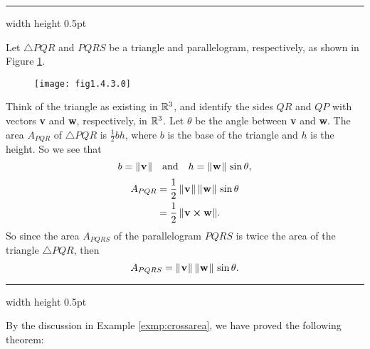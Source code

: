 \vspace{4mm}
\hrule width \textwidth height 0.5pt
\begin{exmp}\label{exmp:crossarea}
 Let $\triangle PQR$ and $PQRS$ be a triangle and parallelogram, respectively, as shown in Figure \ref{fig:crossarea}.

 \begin{figure}[h]
 \begin{center}
  \texttt{[image: fig1.4.3.0]}\vspace{-5mm}
 \end{center}
 \caption[]{}
 \label{fig:crossarea}
\end{figure}

 Think of the triangle as existing in $\mathbb{R}^{3}$, and identify the sides $QR$ and $QP$ with vectors \textbf{v} and
 \textbf{w}, respectively, in $\mathbb{R}^{3}$. Let $\theta$ be the angle between \textbf{v} and \textbf{w}. The area
 $A_{PQR}$ of $\triangle PQR$ is $\frac{1}{2} b h$, where $b$ is the base of the triangle and $h$ is the height. So
 we see that
 \begin{displaymath}
  b = \lVert\mspace{1mu}\textbf{v}\mspace{1mu}\rVert \quad \text{and} \quad h = \lVert\mspace{1mu}\textbf{w}\mspace{1mu}\rVert\,\sin \theta,
 \end{displaymath}
 \begin{align*}
  A_{PQR} &= \frac{1}{2}\,\lVert\mspace{1mu}\textbf{v}\mspace{1mu}\rVert\,\lVert\mspace{1mu}\textbf{w}\mspace{1mu}\rVert\,\sin \theta
  \\
  &= \frac{1}{2}\,\lVert\mspace{1mu}\textbf{v} \bm{\times} \textbf{w}\mspace{1mu}\rVert.
 \end{align*}
 So since the area $A_{PQRS}$ of the parallelogram $PQRS$ is twice the area of the triangle $\triangle PQR$, then
 \begin{displaymath}
  A_{PQRS} = \lVert\mspace{1mu}\textbf{v}\mspace{1mu}\rVert\,\lVert\mspace{1mu}\textbf{w}\mspace{1mu}\rVert\,\sin \theta.
 \end{displaymath}
\end{exmp}
\hrule width \textwidth height 0.5pt
\vspace{4mm}

By the discussion in Example \ref{exmp:crossarea}, we have proved the following theorem:

